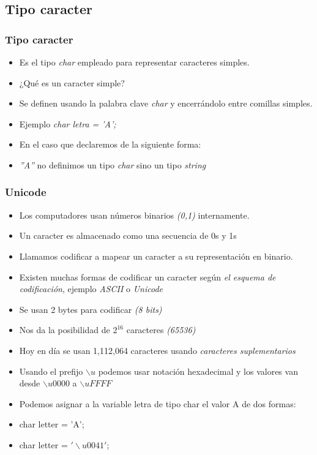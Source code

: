 \documentclass{beamer}
\begin{document}
\subsection{Tipo caracter}
\begin{frame}
\frametitle{Tipo caracter}
\begin{itemize}[<+-|alert@+>]
\item Es el tipo \emph{char} empleado para representar caracteres simples.
\item ¿Qué es un caracter simple?
\item Se definen usando la palabra clave \emph{char} y encerrándolo entre comillas simples.
\item Ejemplo \emph{char letra = 'A';}
\item En el caso que declaremos de la siguiente forma:
\item \emph{''A''} no definimos un tipo \emph{char} sino un tipo \emph{string}
\end{itemize}
\pause

\end{frame}

\begin{frame}[fragile]
\frametitle{Unicode}
\begin{small}
\begin{itemize}[<+-|alert@+>]
\item Los computadores usan números binarios \emph{(0,1)} internamente.
\item Un caracter es almacenado como una secuencia de 0s y 1s
\item Llamamos codificar a mapear un caracter a su representación en binario.
\item Existen muchas formas de codificar un caracter según \emph{el esquema de codificación}, ejemplo \emph{ASCII} o \emph{Unicode}
\item Se usan 2 bytes para codificar \emph{(8 bits)}
\item Nos da la posibilidad de $2^{16}$ caracteres \emph{(65536)} 
\item Hoy en día se usan 1,112,064 caracteres usando \emph{caracteres suplementarios}
\item Usando el prefijo $\backslash u$ podemos usar notación hexadecimal y los valores van desde $\backslash u0000$ a $\backslash uFFFF$ 
\item Podemos asignar a la variable letra de tipo char el valor A de dos formas:
\item char letter = 'A';
\item char letter = $'\backslash u0041'$; 
\end{itemize}
\end{small}
\pause

\end{frame}
\end{document}

